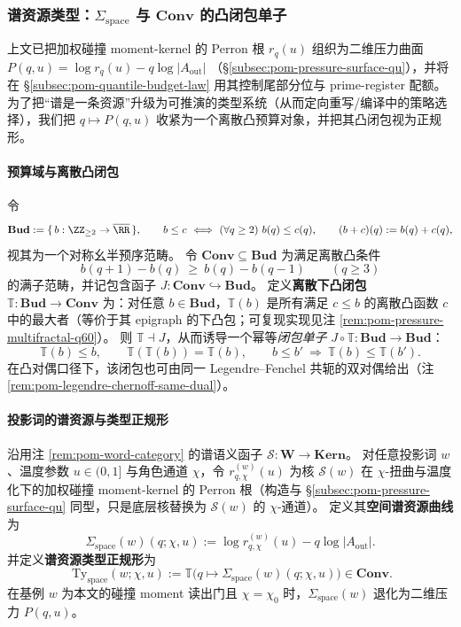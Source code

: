 \subsubsection{谱资源类型：\texorpdfstring{$\Sigma_{\mathrm{space}}$}{Sigma space} 与 \texorpdfstring{$\mathbf{Conv}$}{Conv} 的凸闭包单子}\label{subsec:pom-spectral-resource-type}

上文已把加权碰撞 moment-kernel 的 Perron 根 \(r_q(u)\) 组织为二维压力曲面
\(
P(q,u)=\log r_q(u)-q\log|A_{\mathrm{out}}|
\)
（\S\ref{subsec:pom-pressure-surface-qu}），并将在 \S\ref{subsec:pom-quantile-budget-law} 用其控制尾部分位与 prime-register 配额。
为了把“谱是一条资源”升级为可推演的类型系统（从而定向重写/编译中的策略选择），我们把 \(q\mapsto P(q,u)\) 收紧为一个离散凸预算对象，并把其凸闭包视为正规形。

\paragraph{预算域与离散凸闭包}
令
\[
\mathbf{Bud}:=\{\,b:\ZZ_{\ge 2}\to\overline{\RR}\,\},
\qquad
b\le c\ \Longleftrightarrow\ (\forall q\ge 2)\ b(q)\le c(q),
\qquad
(b+c)(q):=b(q)+c(q),
\]
视其为一个对称幺半预序范畴。
令 \(\mathbf{Conv}\subseteq \mathbf{Bud}\) 为满足离散凸条件
\[
b(q+1)-b(q)\ \ge\ b(q)-b(q-1)\qquad(q\ge 3)
\]
的满子范畴，并记包含函子 \(J:\mathbf{Conv}\hookrightarrow \mathbf{Bud}\)。
定义\textbf{离散下凸闭包} \(\mathbb{T}:\mathbf{Bud}\to\mathbf{Conv}\) 为：对任意 \(b\in\mathbf{Bud}\)，\(\mathbb{T}(b)\) 是所有满足 \(c\le b\) 的离散凸函数 \(c\) 中的最大者（等价于其 epigraph 的下凸包；可复现实现见注 \ref{rem:pom-pressure-multifractal-q60}）。
则 \(\mathbb{T}\dashv J\)，从而诱导一个幂等\emph{闭包单子} \(J\circ\mathbb{T}:\mathbf{Bud}\to\mathbf{Bud}\)：
\[
\mathbb{T}(b)\le b,\qquad
\mathbb{T}(\mathbb{T}(b))=\mathbb{T}(b),\qquad
b\le b'\ \Longrightarrow\ \mathbb{T}(b)\le \mathbb{T}(b').
\]
在凸对偶口径下，该闭包也可由同一 Legendre--Fenchel 共轭的双对偶给出（注 \ref{rem:pom-legendre-chernoff-same-dual}）。

\paragraph{投影词的谱资源与类型正规形}
沿用注 \ref{rem:pom-word-category} 的谱语义函子 \(\mathcal{S}:\mathbf{W}\to \mathbf{Kern}\)。
对任意投影词 \(w\)、温度参数 \(u\in(0,1]\) 与角色通道 \(\chi\)，令 \(r^{(w)}_{q,\chi}(u)\) 为核 \(\mathcal{S}(w)\) 在 \(\chi\)-扭曲与温度化下的加权碰撞 moment-kernel 的 Perron 根（构造与 \S\ref{subsec:pom-pressure-surface-qu} 同型，只是底层核替换为 \(\mathcal{S}(w)\) 的 \(\chi\)-通道）。
定义其\textbf{空间谱资源曲线}为
\[
\Sigma_{\mathrm{space}}(w)(q;\chi,u)
:=\log r^{(w)}_{q,\chi}(u)-q\log|A_{\mathrm{out}}|.
\]
并定义\textbf{谱资源类型正规形}为
\[
\boxed{\;
\mathrm{Ty}_{\mathrm{space}}(w;\chi,u)
:=\mathbb{T}\bigl(q\mapsto \Sigma_{\mathrm{space}}(w)(q;\chi,u)\bigr)\in\mathbf{Conv}.}
\]
在基例 \(w\) 为本文的碰撞 moment 读出门且 \(\chi=\chi_0\) 时，\(\Sigma_{\mathrm{space}}(w)\) 退化为二维压力 \(P(q,u)\)。

